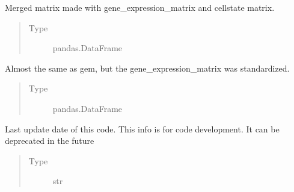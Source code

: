 \documentclass[letterpaper,10pt,english]{sphinxmanual}
\begin{document}
\begin{fulllineitems}

\begin{fulllineitems}
\label{\detokenize{modules/celloracle:celloracle.Net.gem}}
Merged matrix made with gene\_expression\_matrix and cellstate matrix.
\begin{quote}\begin{description}
\item[{Type}] \leavevmode
pandas.DataFrame

\end{description}\end{quote}

\end{fulllineitems}


\begin{fulllineitems}
\label{\detokenize{modules/celloracle:celloracle.Net.gem_standerdized}}
Almost the same as gem, but the gene\_expression\_matrix was standardized.
\begin{quote}\begin{description}
\item[{Type}] \leavevmode
pandas.DataFrame

\end{description}\end{quote}

\end{fulllineitems}


\begin{fulllineitems}
\label{\detokenize{modules/celloracle:celloracle.Net.library_last_update_date}}
Last update date of this code. This info is for code development. It can be deprecated in the future
\begin{quote}\begin{description}
\item[{Type}] \leavevmode
str

\end{description}\end{quote}


\end{fulllineitems}
\end{fulllineitems}
\end{document}
